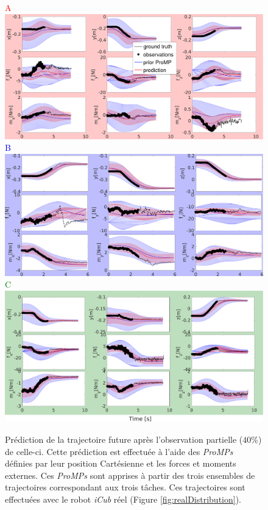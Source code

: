 \documentclass[utf8]{frontiersSCNS} %
\begin{document}
\begin{figure}[!h]
\centering
{
\textcolor{red}{A}\\
\includegraphics[width=14cm]{img/withWrenchInfA.pdf}\\
\textcolor{blue}{B}\\
\includegraphics[width=14cm]{img/withWrenchInfB.pdf}\\
\textcolor{green}{C}\\
\includegraphics[width=14cm]{img/withWrenchInfC.pdf}\\
}
\caption{
Prédiction de la trajectoire future après l'observation partielle ($40\%$) de celle-ci. Cette prédiction est effectuée à l'aide des \textit{ProMPs} définies par leur position Cartésienne et les forces et moments externes. Ces \textit{ProMPs} sont apprises à partir des trois ensembles de trajectoires correspondant aux trois tâches. Ces trajectoires sont effectuées avec le robot \textit{iCub} réel (Figure \ref{fig:realDistribution}).}
\label{fig:realTrajectoriesPredictionsWithForces}
\end{figure}
\end{document}
